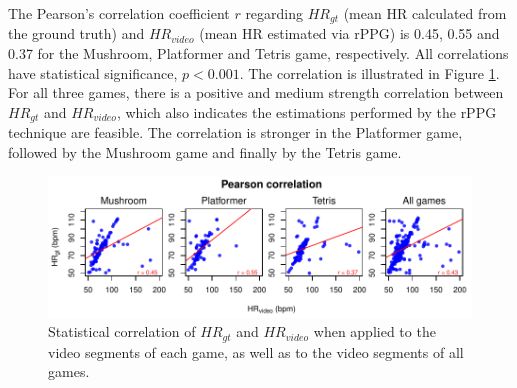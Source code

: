 \begin{table}
\label{table:rppg-validation-games}
\end{table}

The Pearson's correlation coefficient $r$ regarding $HR_{gt}$ (mean HR calculated from the ground truth) and $HR_{video}$ (mean HR estimated via rPPG) is 0.45, 0.55 and 0.37 for the Mushroom, Platformer and Tetris game, respectively. All correlations have statistical significance, $p < 0.001$. The correlation is illustrated in Figure \ref{fig:chart-r-games}. For all three games, there is a positive and medium strength correlation between $HR_{gt}$ and $HR_{video}$, which also indicates the estimations performed by the rPPG technique are feasible. The correlation is stronger in the Platformer game, followed by the Mushroom game and finally by the Tetris game.

\begin{figure}
\centering
\includegraphics[width=\columnwidth]{figures/correlation-hrgt-hrvideo.pdf}
\caption{Statistical correlation of $HR_{gt}$ and $HR_{video}$ when applied to the video segments of each game, as well as to the video segments of all games.}
\label{fig:chart-r-games}
\end{figure}

